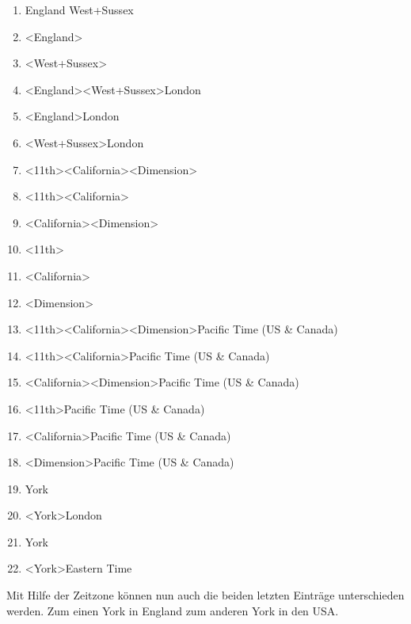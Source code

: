 				\begin{multicols}{2}
					\begin{enumerate}
						\item England West+Sussex
						\item \textless England\textgreater  
						\item \textless West+Sussex\textgreater  
						\item \textless England\textgreater   \textless West+Sussex\textgreater   London
						\item \textless England\textgreater   London
						\item \textless West+Sussex\textgreater   London
						\item \textless 11th\textgreater   \textless California\textgreater   \textless Dimension\textgreater    
						\item \textless 11th\textgreater   \textless California\textgreater  
						\item \textless California\textgreater   \textless Dimension\textgreater   
						\item \textless 11th\textgreater  
						\item \textless California\textgreater  
						\item \textless Dimension\textgreater   
						\item \textless 11th\textgreater \textless California\textgreater   \textless Dimension\textgreater   Pacific Time (US \& Canada)
						\item \textless 11th\textgreater   \textless California\textgreater   Pacific Time (US \& Canada)
						\item \textless California\textgreater   \textless Dimension\textgreater   Pacific Time (US \& Canada)
						\item \textless 11th\textgreater   Pacific Time (US \& Canada)
						\item \textless California\textgreater   Pacific Time (US \& Canada)
						\item \textless Dimension\textgreater   Pacific Time (US \& Canada)
						\item York
						\item \textless York\textgreater   London
						\item York
						\item \textless York\textgreater   Eastern Time
					\end{enumerate}	
				\end{multicols}
				Mit Hilfe der Zeitzone können nun auch die beiden letzten Einträge unterschieden werden. 
				Zum einen York in England zum anderen York in den USA. 

